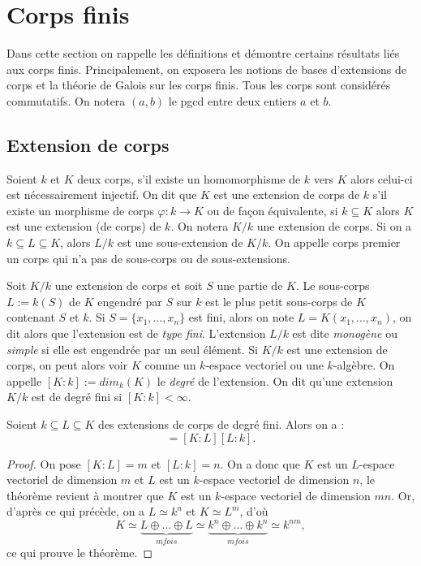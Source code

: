 \documentclass[a4paper]{article} %
\numberwithin{section}{part}
\numberwithin{equation}{section}
\begin{document}
\section{Corps finis}
Dans cette section on rappelle les définitions et démontre certains 
résultats liés aux corps finis. Principalement, on exposera les notions de bases
d'extensions de corps et la théorie de Galois sur les corps finis. 
Tous les corps sont considérés commutatifs. On notera $(a,b)$ le pgcd entre deux
entiers $a$ et $b$.


\subsection{Extension de corps}
\label{def:degext}
Soient $k$ et $K$ deux corps, s'il existe un homomorphisme de $k$ vers $K$ alors
celui-ci est nécessairement injectif. On dit que $K$ est une extension de corps 
de $k$ s'il existe un morphisme de corps $\varphi : k \to K$ ou de façon 
équivalente, si $k \subseteq K$ alors $K$ est une extension (de corps) de $k$. 
On notera $K/k$ une extension de corps. Si on a $k\subseteq L \subseteq K$, 
alors $L/k$ est une sous-extension de $K/k$. On appelle corps premier un corps 
qui n'a pas de sous-corps ou de sous-extensions.\par
Soit $K/k$ une extension de corps et soit $S$ une partie de $K$. Le sous-corps 
$L := k(S)$ de $K$ engendré par $S$ sur $k$ est le plus petit sous-corps de $K$ 
contenant $S$ et $k$. Si $S = \lbrace x_1,\dots,x_n \rbrace$ est fini, alors on 
note $L = K(x_1,\dots,x_n)$, on dit alors que l'extension est de \emph{type
fini}. L'extension $L/k$ est dite \emph{monogène} ou \emph{simple} si elle est
engendrée par un seul élément. Si $K/k$ est une extension de corps, on peut
alors voir $K$ comme un $k$-espace vectoriel ou une $k$-algèbre. On appelle 
$[K:k] := dim_k(K)$ le \emph{degré} de l'extension. On dit qu'une extension 
$K/k$ est de degré fini si $[K:k] < \infty$.\par

\begin{thm}
Soient $k \subseteq L \subseteq K$ des extensions de corps de degré fini. Alors 
on a :
\begin{equation}
[K:k] = [K:L][L:k].
\end{equation}
\end{thm}
\begin{proof}
On pose $[K:L] = m$ et $[L:k] = n$. On a donc que $K$ est un $L$-espace 
vectoriel de dimension $m$ et $L$ est un $k$-espace vectoriel de dimension $n$, 
le théorème revient à montrer que $K$ est un $k$-espace vectoriel de dimension 
$mn$. Or, d'après ce qui précède, on a $L \simeq k^n$ et $K \simeq L^m$, d'où
\begin{equation}
K \simeq \underbrace{L \oplus\dots\oplus L}_{m fois}\simeq\underbrace
{k^n\oplus\dots\oplus k^n}_{m fois} \simeq k^{nm},
\end{equation}
ce qui prouve le théorème.
\end{proof}
\end{document}
